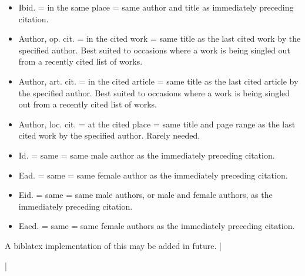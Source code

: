\documentclass[extrafontsizes,11pt,a4paper,oneside]{memoir}
\begin{document}
\begin{itemize}
  \item Ibid. = in the same place = same author and title as immediately preceding citation.
  \item Author, op. cit. = in the cited work = same title as the last cited work by the specified author. Best suited to occasions where a work is being singled out from a recently cited list of works. 
  \item Author, art. cit. = in the cited article = same title as the last cited article by the specified author. Best suited to occasions where a work is being singled out from a recently cited list of works.
  \item Author, loc. cit. = at the cited place = same title and page range as the last cited work by the specified author. Rarely needed.
  \item Id. = same = same male author as the immediately preceding citation.
  \item Ead. = same = same female author as the immediately preceding citation.
  \item Eid. = same = same male authors, or male and female authors, as the immediately preceding citation.
  \item Eaed. = same = same female authors as the immediately preceding citation.
\end{itemize}

A \textsf{biblatex} implementation of this may be added in future.
|


\todoc|
\printbibliography[notcategory=reviewed]
\end{document}
